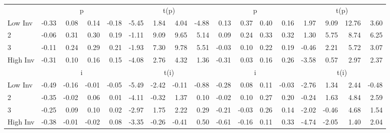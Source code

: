 \begin{table}[!ht]
\begin{tabular}{lrrrrrrrrrrrrrrrr}
  
    
      & \multicolumn{4}{c}{p} & \multicolumn{4}{c}{t(p)}
    
      & \multicolumn{4}{c}{p} & \multicolumn{4}{c}{t(p)}
    
    \\
      \cmidrule(r){2-5} \cmidrule(r){6-9} \cmidrule(r){10-13} \cmidrule(r){14-17}

    Low Inv   & -0.33  & 0.08  & 0.14  & -0.18  & -5.45  & 1.84  & 4.04  & -4.88  & 0.13  & 0.37  & 0.40  & 0.16  & 1.97  & 9.09  & 12.76  & 3.60  \\
           2  & -0.06  & 0.31  & 0.30  & 0.19  & -1.11  & 9.09  & 9.65  & 5.14  & 0.09  & 0.24  & 0.33  & 0.32  & 1.30  & 5.75  & 8.74  & 6.25  \\
           3  & -0.11  & 0.24  & 0.29  & 0.21  & -1.93  & 7.30  & 9.78  & 5.51  & -0.03  & 0.10  & 0.22  & 0.19  & -0.46  & 2.21  & 5.72  & 3.07  \\
    High Inv  & -0.31  & 0.10  & 0.16  & 0.15  & -4.08  & 2.76  & 4.32  & 1.36  & -0.31  & 0.03  & 0.16  & 0.26  & -3.58  & 0.57  & 2.97  & 2.37  \\

  
    
      & \multicolumn{4}{c}{i} & \multicolumn{4}{c}{t(i)}
    
      & \multicolumn{4}{c}{i} & \multicolumn{4}{c}{t(i)}
    
    \\
      \cmidrule(r){2-5} \cmidrule(r){6-9} \cmidrule(r){10-13} \cmidrule(r){14-17}

    Low Inv   & -0.49  & -0.16  & -0.01  & -0.05  & -5.49  & -2.42  & -0.11  & -0.88  & -0.28  & 0.08  & 0.11  & -0.03  & -2.76  & 1.34  & 2.44  & -0.48  \\
           2  & -0.35  & -0.02  & 0.06  & 0.01  & -4.11  & -0.32  & 1.37  & 0.10  & -0.02  & 0.10  & 0.27  & 0.20  & -0.24  & 1.63  & 4.84  & 2.59  \\
           3  & -0.25  & 0.09  & 0.10  & 0.02  & -2.97  & 1.75  & 2.22  & 0.29  & -0.21  & -0.03  & 0.26  & 0.14  & -2.02  & -0.46  & 4.68  & 1.54  \\
    High Inv  & -0.38  & -0.01  & -0.02  & 0.08  & -3.35  & -0.26  & -0.41  & 0.50  & -0.61  & -0.16  & 0.11  & 0.33  & -4.74  & -2.05  & 1.40  & 2.04  \\

  

  \bottomrule
\end{tabular}
\label{tbl:32_Size_BM_Prior_FF2015}
\end{table}